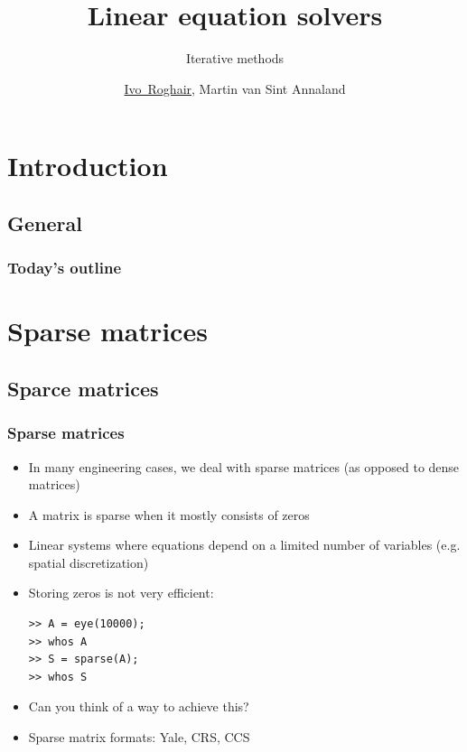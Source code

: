 \documentclass[11pt,table,final,xcolor={usenames,dvipsnames,table}]{beamer}
\title{Linear equation solvers}
\subtitle{Iterative methods}
\author[I.~Roghair]{\underline{Ivo~Roghair}, Martin van Sint Annaland}
\institute[SPI]{{Chemical Process Intensification,\\
  Eindhoven University of Technology}}
\date
\begin{document}


\frame[plain]{
  \titlepage
}
\section{Introduction}
\subsection*{General}
\begin{frame}[label=contents]
  \frametitle{Today's outline}
\end{frame}

\section{Sparse matrices}
\subsection*{Sparce matrices}

\begin{frame}[fragile]
  \frametitle{Sparse matrices}
  \begin{itemize}
    \item In many engineering cases, we deal with sparse matrices (as opposed to dense matrices)
    \item A matrix is sparse when it mostly consists of zeros
    \item Linear systems where equations depend on a limited number of variables (e.g. spatial discretization)
    \item Storing zeros is not very efficient:
    \begin{lstlisting}
>> A = eye(10000);
>> whos A
>> S = sparse(A);
>> whos S
    \end{lstlisting}
    \item Can you think of a way to achieve this?
    \item Sparse matrix formats: Yale, CRS, CCS
\end{itemize}
\end{frame}
\end{document}
